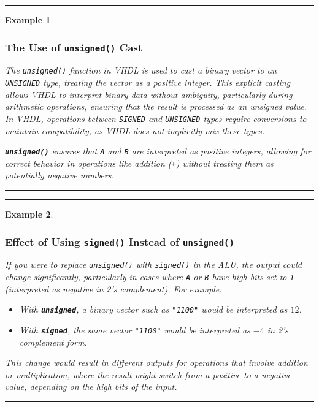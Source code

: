 \documentclass[12pt]{article}
\newtheorem{example}{Example}
\newenvironment{examp}
{
	\vspace{.5cm}
	\hrule
\begin{example}\upshape}
	{\hrule
		\vspace{0.5cm}
\end{example}}
\begin{document}
\begin{examp}
	\vspace{.5mm}
	\subsubsection*{The Use of \texttt{unsigned()} Cast}
	The \texttt{unsigned()} function in VHDL is used to cast a binary vector to an \texttt{UNSIGNED} type, treating the vector as a positive integer. This explicit casting allows VHDL to interpret binary data without ambiguity, particularly during arithmetic operations, ensuring that the result is processed as an unsigned value. In VHDL, operations between \texttt{SIGNED} and \texttt{UNSIGNED} types require conversions to maintain compatibility, as VHDL does not implicitly mix these types.
	
	\textbf{\texttt{unsigned()}} ensures that \texttt{A} and \texttt{B} are interpreted as positive integers, allowing for correct behavior in operations like addition (\texttt{+}) without treating them as potentially negative numbers.
	
\end{examp}
\begin{examp}
	\subsubsection*{Effect of Using \texttt{signed()} Instead of \texttt{unsigned()}}
	
	If you were to replace \texttt{unsigned()} with \texttt{signed()} in the ALU, the output could change significantly, particularly in cases where \texttt{A} or \texttt{B} have high bits set to \texttt{1} (interpreted as negative in 2’s complement). For example:
	\begin{itemize}
		\item With \textbf{\texttt{unsigned}}, a binary vector such as \texttt{"1100"} would be interpreted as \(12\).
		\item With \textbf{\texttt{signed}}, the same vector \texttt{"1100"} would be interpreted as \(-4\) in 2's complement form.
	\end{itemize}
	
	
	This change would result in different outputs for operations that involve addition or multiplication, where the result might switch from a positive to a negative value, depending on the high bits of the input.
\end{examp}
\end{document}
